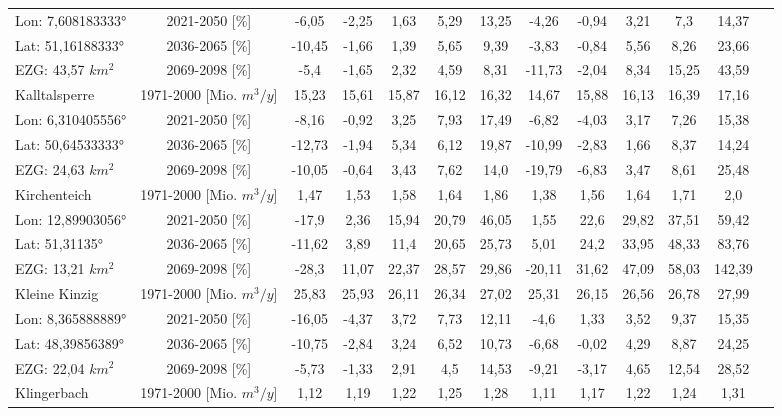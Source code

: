 \begin{longtable}{@{\extracolsep{\fill}}lc|ccccc||cccccc}
\cline{2-13} 
Lon: 7,608183333° & 2021-2050 [\%]  & -6,05 & -2,25 & 1,63 & 5,29 & 13,25 & -4,26 & -0,94 & 3,21 & 7,3 & 14,37 & \\ 
Lat: 51,16188333° & 2036-2065 [\%]  & -10,45 & -1,66 & 1,39 & 5,65 & 9,39 & -3,83 & -0,84 & 5,56 & 8,26 & 23,66 & \\ 
EZG: 43,57 $km^2$ & 2069-2098 [\%]  & -5,4 & -1,65 & 2,32 & 4,59 & 8,31 & -11,73 & -2,04 & 8,34 & 15,25 & 43,59 & \\ 
\hline 
Kalltalsperre & 1971-2000 [Mio. $m^3/y$]  & 15,23 & 15,61 & 15,87 & 16,12 & 16,32 & 14,67 & 15,88 & 16,13 & 16,39 & 17,16 & \\ 
\cline{2-13} 
Lon: 6,310405556° & 2021-2050 [\%]  & -8,16 & -0,92 & 3,25 & 7,93 & 17,49 & -6,82 & -4,03 & 3,17 & 7,26 & 15,38 & \\ 
Lat: 50,64533333° & 2036-2065 [\%]  & -12,73 & -1,94 & 5,34 & 6,12 & 19,87 & -10,99 & -2,83 & 1,66 & 8,37 & 14,24 & \\ 
EZG: 24,63 $km^2$ & 2069-2098 [\%]  & -10,05 & -0,64 & 3,43 & 7,62 & 14,0 & -19,79 & -6,83 & 3,47 & 8,61 & 25,48 & \\ 
\hline 
Kirchenteich & 1971-2000 [Mio. $m^3/y$]  & 1,47 & 1,53 & 1,58 & 1,64 & 1,86 & 1,38 & 1,56 & 1,64 & 1,71 & 2,0 & \\ 
\cline{2-13} 
Lon: 12,89903056° & 2021-2050 [\%]  & -17,9 & 2,36 & 15,94 & 20,79 & 46,05 & 1,55 & 22,6 & 29,82 & 37,51 & 59,42 & \\ 
Lat: 51,31135° & 2036-2065 [\%]  & -11,62 & 3,89 & 11,4 & 20,65 & 25,73 & 5,01 & 24,2 & 33,95 & 48,33 & 83,76 & \\ 
EZG: 13,21 $km^2$ & 2069-2098 [\%]  & -28,3 & 11,07 & 22,37 & 28,57 & 29,86 & -20,11 & 31,62 & 47,09 & 58,03 & 142,39 & \\ 
\hline 
Kleine Kinzig & 1971-2000 [Mio. $m^3/y$]  & 25,83 & 25,93 & 26,11 & 26,34 & 27,02 & 25,31 & 26,15 & 26,56 & 26,78 & 27,99 & \\ 
\cline{2-13} 
Lon: 8,365888889° & 2021-2050 [\%]  & -16,05 & -4,37 & 3,72 & 7,73 & 12,11 & -4,6 & 1,33 & 3,52 & 9,37 & 15,35 & \\ 
Lat: 48,39856389° & 2036-2065 [\%]  & -10,75 & -2,84 & 3,24 & 6,52 & 10,73 & -6,68 & -0,02 & 4,29 & 8,87 & 24,25 & \\ 
EZG: 22,04 $km^2$ & 2069-2098 [\%]  & -5,73 & -1,33 & 2,91 & 4,5 & 14,53 & -9,21 & -3,17 & 4,65 & 12,54 & 28,52 & \\ 
\hline 
Klingerbach & 1971-2000 [Mio. $m^3/y$]  & 1,12 & 1,19 & 1,22 & 1,25 & 1,28 & 1,11 & 1,17 & 1,22 & 1,24 & 1,31 & \\ 

\end{longtable}
